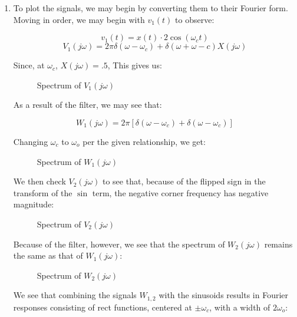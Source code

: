 \begin{enumerate}
\begin{enumerate}
    \end{enumerate}

  \item To plot the signals, we may begin by converting them to their Fourier form. Moving in order, we may begin with $v_1(t)$ to observe:

    $$v_1(t)=x(t)\cdot2\cos(\omega_c t)$$
    $$V_1(j\omega)=2\pi\delta(\omega-\omega_c)+\delta(\omega+\omega-c)X(j\omega)$$

    Since, at $\omega_c$, $X(j\omega)=.5$, This gives us:

    \begin{figure}[H]
      \centering
      
      \caption{Spectrum of $V_1(j\omega)$}
      \label{fig:1}
    \end{figure}

    As a result of the filter, we may see that:
    
    $$W_1(j\omega)=2\pi\left[ \delta(\omega-\omega_c)+\delta(\omega-\omega_c) \right]$$

    Changing $\omega_c$ to $\omega_o$ per the given relationship, we get:

    \begin{figure}[H]
      \centering
      
      \caption{Spectrum of $W_1(j\omega)$}
      \label{fig:2}
    \end{figure}

    We then check $V_2(j\omega)$ to see that, because of the flipped sign in the transform of the $\sin$ term, the negative corner frequency has negative magnitude:

    \begin{figure}[H]
      \centering
      
      \caption{Spectrum of $V_2(j\omega)$}
      \label{fig:3}
    \end{figure}

    Because of the filter, however, we see that the spectrum of $W_2(j\omega)$ remains the same as that of $W_1(j\omega)$:

    \begin{figure}[H]
      \centering
      
      \caption{Spectrum of $W_2(j\omega)$}
      \label{fig:4}
    \end{figure}

    We see that combining the signals $W_{1,2}$ with the sinusoids results in Fourier responses consisting of rect functions, centered at $\pm\omega_c$, with a width of $2\omega_o$:


\end{enumerate}
